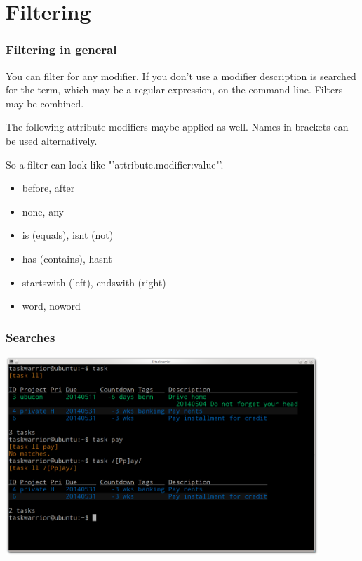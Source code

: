 \documentclass[t,handout]{beamer}
\begin{document}
\section{Filtering}

\begin{frame}\frametitle{Filtering in general}

You can filter for any modifier. If you don't use a modifier description is searched for the term, which may be a regular expression, on the command line. Filters may be combined.

The following attribute modifiers maybe applied as well. Names in brackets can be used alternatively.

So a filter can look like "'attribute.modifier:value"'.

\begin{itemize}
\item before, after
\item none, any
\item is (equals), isnt (not)
\item has (contains), hasnt
\item startswith (left), endswith (right)
\item word, noword
\end{itemize}
\end{frame}

\begin{frame}[fragile]\frametitle{Searches}
\begin{center} %
\includegraphics[width=11.8cm,height=7.5cm]{searches.png}
\end{center}
\end{frame}
\end{document}
